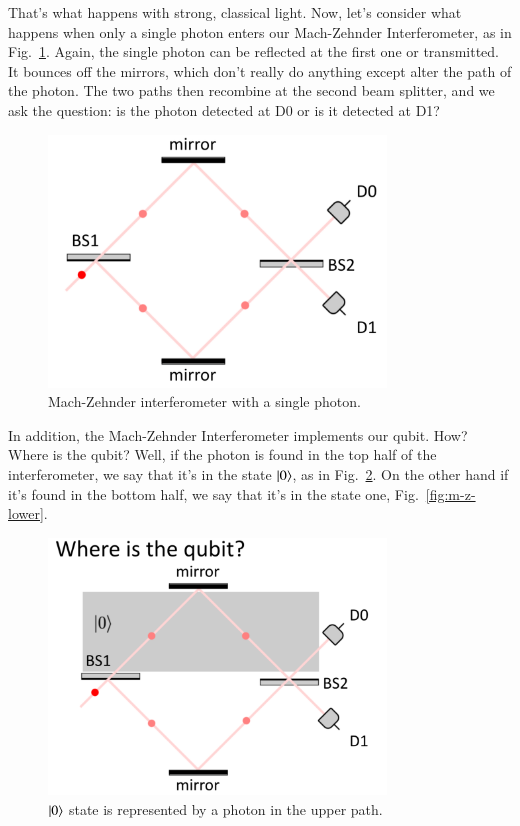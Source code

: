 That's what happens with strong, classical light. Now, let's consider what happens when only a single photon enters our Mach-Zehnder Interferometer, as in Fig.~\ref{fig:mach-zehnder-single-photon}. Again, the single photon can be reflected at the first one or transmitted. It bounces off the mirrors, which don't really do anything except alter the path of the photon.  The two paths then recombine at the second beam splitter, and we ask the question: is the photon detected at D0 or is it detected at D1?
\begin{figure}[H]
   \centering
    \includegraphics[width=0.8\textwidth]{lesson6/mach_zehnder_single_photon.pdf}
    
        \caption{Mach-Zehnder interferometer with a single photon.}
    \label{fig:mach-zehnder-single-photon}    
\end{figure}

In addition, the Mach-Zehnder Interferometer implements our qubit. How? Where is the qubit? Well, if the photon is found in the top half of the interferometer, we say that it's in the state $\left| 0 \right\rangle$, as in Fig.~\ref{fig:m-z-upper}. On the other hand if it's found in the bottom half, we say that it's in the state one, Fig.~\ref{fig:m-z-lower}. 

\begin{figure}[H]
   \centering
    \includegraphics[width=0.8\textwidth]{lesson6/0_ket_botttom.pdf}
    
        \caption{$\left| 0 \right\rangle$ state is represented by a photon in the upper path.}
    \label{fig:m-z-upper}
    
\end{figure}

